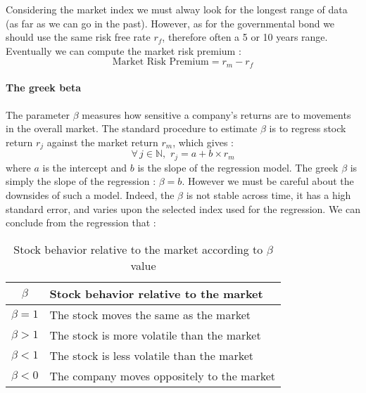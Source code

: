 \vfill


Considering the market index we must alway look for the longest range of data (as far as we can go in the past). However, as for the governmental bond we should use the same risk free rate $r_f$, therefore often a 5 or 10 years range. Eventually we can compute the market risk premium : 
$$
\text{Market Risk Premium} = r_m - r_f
$$

\paragraph{The greek beta}

The parameter $\beta$ measures how sensitive a company’s returns are to movements in the overall market. The standard procedure to estimate $\beta$ is to regress stock return $r_j$ against the market return $r_m$, which gives : 
\begin{equation}
    \forall\,j\in \mathbb{N},\,\, r_j = a+b\times r_m
\end{equation}
where $a$ is the intercept and $b$ is the slope of the regression model. The greek $\beta$ is simply the slope of the regression : $\beta = b$.  However we must be careful about the downsides of such a model. Indeed, the $\beta$ is not stable across time, it has a high standard error, and varies upon the selected index used for the regression. We can conclude from the regression that :
\begin{table}[H]
    \centering
    \begin{tabularx}{\textwidth}{cX}
        \toprule
        $\beta$ & \textbf{Stock behavior relative to the market} \\
        \midrule
        $\beta = 1$ & The stock moves the same as the market \\ 
        $\beta > 1$ & The stock is more volatile than the market \\
        $\beta < 1$ & The stock is less volatile than the market \\
        $\beta < 0$ & The company moves oppositely to the market \\
        \bottomrule
    \end{tabularx}
    \caption{Stock behavior relative to the market according to $\beta$ value}
    \label{tab:my_label}
\end{table}


